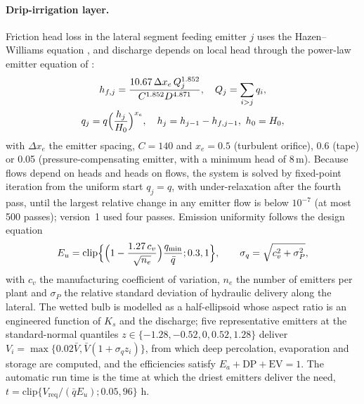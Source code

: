 \documentclass[preprint,12pt]{elsarticle}
\begin{document}
\paragraph{Drip-irrigation layer.}
\label{sec:drip-m}
Friction head loss in the lateral segment feeding emitter $j$ uses the Hazen--Williams equation \cite{Hazen1905}, and discharge depends on local head through the power-law emitter equation of \cite{KellerKarmeli1974}:
\begin{equation}
\begin{gathered}h_{f,j}=\frac{10.67\,\Delta x_e\,Q_j^{1.852}}{C^{1.852}D^{4.871}},\quad Q_j=\sum_{i>j}q_i,\\ q_j=q\Bigl(\frac{h_j}{H_0}\Bigr)^{x_e},\quad h_j=h_{j-1}-h_{f,j-1},\ h_0=H_0,\end{gathered}
\label{eq:HW}
\end{equation}
with $\Delta x_e$ the emitter spacing, $C=140$ and $x_e=0.5$ (turbulent orifice), 0.6 (tape) or 0.05 (pressure-compensating emitter, with a minimum head of 8\,m). Because flows depend on heads and heads on flows, the system is solved by fixed-point iteration from the uniform start $q_j=q$, with under-relaxation after the fourth pass, until the largest relative change in any emitter flow is below $10^{-7}$ (at most 500 passes); version~1 used four passes. Emission uniformity follows the design equation
\begin{equation}
E_u=\mathrm{clip}\Bigl\{\Bigl(1-\frac{1.27\,c_v}{\sqrt{n_e}}\Bigr)\frac{q_{\min}}{\bar q};0.3,1\Bigr\},\qquad \sigma_q=\sqrt{c_v^2+\sigma_P^2},
\label{eq:Eu}
\end{equation}
with $c_v$ the manufacturing coefficient of variation, $n_e$ the number of emitters per plant and $\sigma_P$ the relative standard deviation of hydraulic delivery along the lateral. The wetted bulb is modelled as a half-ellipsoid whose aspect ratio is an engineered function of $K_s$ and the discharge; five representative emitters at the standard-normal quantiles $z\in\{-1.28,-0.52,0,0.52,1.28\}$ deliver $V_i=\max\{0.02\bar V,\bar V(1+\sigma_qz_i)\}$, from which deep percolation, evaporation and storage are computed, and the efficiencies satisfy $E_a+\mathrm{DP}+\mathrm{EV}=1$. The automatic run time is the time at which the driest emitters deliver the need, $t=\mathrm{clip}\{V_{\mathrm{req}}/(\bar qE_u);0.05,96\}$ h.
\end{document}
